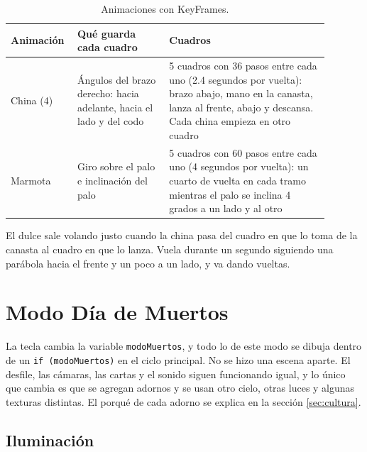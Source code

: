 \documentclass[11pt,a4paper]{article}
\begin{document}
\begin{table}[H]
  \centering
  \small
  \begin{tabular}{|p{0.15\linewidth}|p{0.27\linewidth}|p{0.47\linewidth}|}
    \hline
    \textbf{Animación} & \textbf{Qué guarda cada cuadro} & \textbf{Cuadros} \\ \hline
    China (4) & Ángulos del brazo derecho: hacia adelante, hacia el lado y del codo & 5 cuadros con 36 pasos entre cada uno (2.4 segundos por vuelta): brazo abajo, mano en la canasta, lanza al frente, abajo y descansa. Cada china empieza en otro cuadro \\ \hline
    Marmota & Giro sobre el palo e inclinación del palo & 5 cuadros con 60 pasos entre cada uno (4 segundos por vuelta): un cuarto de vuelta en cada tramo mientras el palo se inclina 4 grados a un lado y al otro \\ \hline
  \end{tabular}
  \caption{Animaciones con KeyFrames.}
\end{table}

El dulce sale volando justo cuando la china pasa del cuadro en que lo toma de la canasta al cuadro en que lo lanza. Vuela durante un segundo siguiendo una parábola hacia el frente y un poco a un lado, y va dando vueltas.


\section{Modo Día de Muertos}
\label{sec:modomuertos}

La tecla  cambia la variable \texttt{modoMuertos}, y todo lo de este modo se dibuja dentro de un \texttt{if (modoMuertos)} en el ciclo principal. No se hizo una escena aparte. El desfile, las cámaras, las cartas y el sonido siguen funcionando igual, y lo único que cambia es que se agregan adornos y se usan otro cielo, otras luces y algunas texturas distintas. El porqué de cada adorno se explica en la sección \ref{sec:cultura}.


\subsection{Iluminación}
\end{document}
